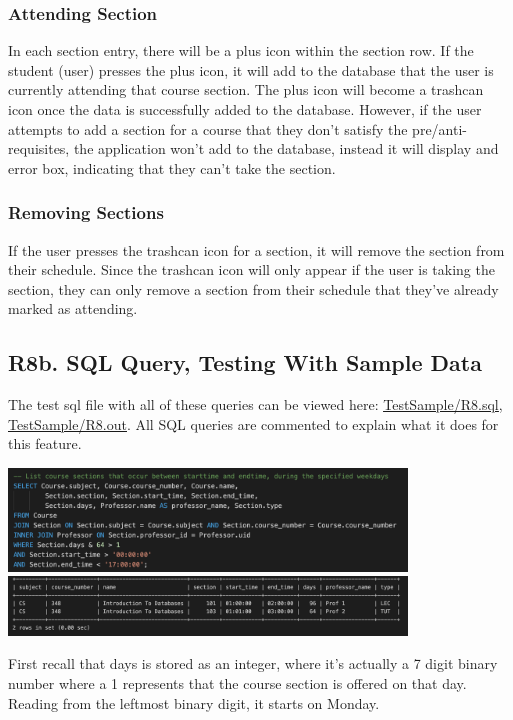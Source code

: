 \documentclass[12pt, a4paper]{article}
\begin{document}
\subsubsection*{Attending Section}
In each section entry, there will be a plus icon within the section row. If the student (user) presses the plus icon, it will add to the database that the user is currently attending that course section. The plus icon will become a trashcan icon once the data is successfully added to the database. However, if the user attempts to add a section for a course that they don't satisfy the pre/anti-requisites, the application won't add to the database, instead it will display and error box, indicating that they can't take the section.
\subsubsection*{Removing Sections}
If the user presses the trashcan icon for a section, it will remove the section from their schedule. Since the trashcan icon will only appear if the user is taking the section, they can only remove a section from their schedule that they've already marked as attending.
\subsection*{R8b. SQL Query, Testing With Sample Data}
The test sql file with all of these queries can be viewed here: \underline{\href{https://github.com/Kggupta/DegreeMap/tree/main/Database/Queries/TestSample}{TestSample/R8.sql}}, \underline{\href{https://github.com/Kggupta/DegreeMap/tree/main/Database/Queries/TestSample}{TestSample/R8.out}}. All SQL queries are commented to explain what it does for this feature.

\begin{center}
    \includegraphics[width=400px]{R8/q1}
    \includegraphics[width=400px]{R8/q1out.png}
\end{center}
First recall that days is stored as an integer, where it's actually a 7 digit binary number where a 1 represents that the course section is offered on that day. Reading from the leftmost binary digit, it starts on Monday.\\
\end{document}
